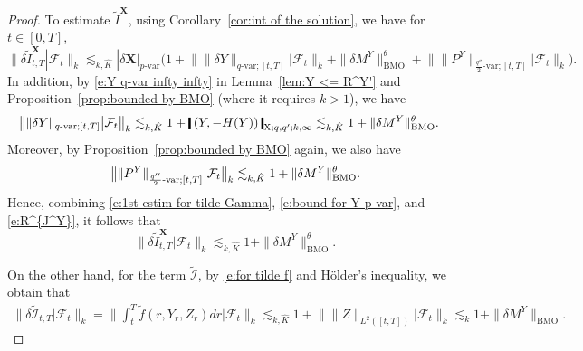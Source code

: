 \documentclass[11pt,reqno]{amsart}
\numberwithin{equation}{section}
\newcommand{\shortthickbar}{%
  \vcenter{\hbox{\rule{1.8pt}{2.2ex}}}%
}
\newcommand{\thicknm}[1]{%
  \mathopen{\shortthickbar}%
  \mkern4mu #1 \mkern4mu%
  \mathclose{\shortthickbar}%
}
\begin{document}
\begin{proof}
To estimate $\tilde{I}^{\mathbf X}$, using Corollary~\ref{cor:int of the solution}, we have for $t\in[0,T]$,
\begin{equation}\label{e:1st estim for tilde Gamma}
\| \delta \tilde{I}^{\mathbf X}_{t,T} | \mathcal F_{t} \|_{k} \lesssim_{k,\hat K} |\delta \mathbf X|_{p\text{-}\mathrm{var}} \Big(1 + \big\| \|\delta Y\|_{q\text{-var};[t,T]} \big| \mathcal F_{t} \big\|_{k} +  \|\delta M^{Y}\|^{\theta}_{\mathrm{BMO}} + \big\| \|P^Y\|_{\frac{q''}{2}\text{-}\mathrm{var};[t,T]} \big| \mathcal F_{t}\big\|_{k} \Big).
\end{equation}
In addition, by \eqref{e:Y q-var infty infty} in Lemma~\ref{lem:Y <= R^Y'} and Proposition~\ref{prop:bounded by BMO} (where it requires $k > 1$), we have 
\begin{equation}\label{e:bound for Y p-var}
\begin{aligned}
\big\| \|\delta Y\|_{q\text{-var};[t,T]} \big| \mathcal F_{t} \big\|_{k}  &\lesssim_{k,\hat K} 1 + \thicknm{(Y,-H(Y))}_{\mathrm X;q,q';k,\infty} \lesssim_{k,\hat K} 1 + \|\delta M^{Y}\|^{\theta}_{\mathrm{BMO}}. 
\end{aligned}
\end{equation}
Moreover, by Proposition~\ref{prop:bounded by BMO} again, we also have 
\begin{equation}\label{e:R^{J^Y}}
\big\| \|P^Y\|_{\frac{q''}{2}\text{-}\mathrm{var};[t,T]} \big| \mathcal F_{t}\big\|_{k} \lesssim_{k,\hat K} 1 + \|\delta M^{Y}\|^{\theta}_{\mathrm{BMO}}.
\end{equation}
Hence, combining \eqref{e:1st estim for tilde Gamma}, \eqref{e:bound for Y p-var}, and \eqref{e:R^{J^Y}}, it follows that 
\begin{equation}\label{e:tilde H <= Z}
\big\| \delta \tilde{I}^{\mathbf X}_{t,T} \big| \mathcal F_{t} \big\|_{k} \lesssim_{k,\hat K} 1  +  \|\delta M^{Y}\|^{\theta}_{\mathrm{BMO}}.
\end{equation}

On the other hand, for the term $\tilde{\mathcal I}$, by  \eqref{e:for tilde f} and H\"older's inequality, we obtain that  
\begin{equation}\label{e:hat Gamma <= Z}
\begin{aligned}
\big\| \delta \tilde{\mathcal I}_{t,T} \big| \mathcal F_{t} \big\|_k = \Big\| \int_{t}^{T} \tilde{f}(r,Y_r,Z_r) dr \Big|\mathcal F_{t}\Big\|_{k}  \lesssim_{k,\hat K} 1 + \Big\| \|Z\|_{L^{2}([t,T])} \Big|\mathcal F_{t}\Big\|_{k} \lesssim_k 1 + \|\delta M^{Y}\|_{\mathrm{BMO}}.
\end{aligned}
\end{equation}


\end{proof}
\end{document}
